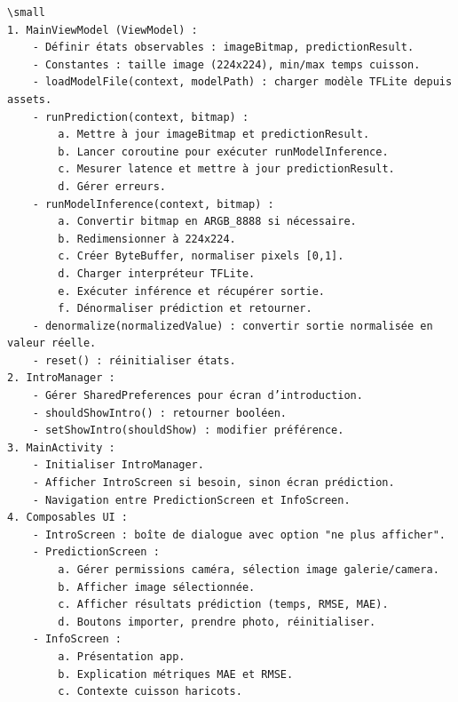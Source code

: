 \begin{verbatim}
\small
1. MainViewModel (ViewModel) :
    - Définir états observables : imageBitmap, predictionResult.
    - Constantes : taille image (224x224), min/max temps cuisson.
    - loadModelFile(context, modelPath) : charger modèle TFLite depuis assets.
    - runPrediction(context, bitmap) :
        a. Mettre à jour imageBitmap et predictionResult.
        b. Lancer coroutine pour exécuter runModelInference.
        c. Mesurer latence et mettre à jour predictionResult.
        d. Gérer erreurs.
    - runModelInference(context, bitmap) :
        a. Convertir bitmap en ARGB_8888 si nécessaire.
        b. Redimensionner à 224x224.
        c. Créer ByteBuffer, normaliser pixels [0,1].
        d. Charger interpréteur TFLite.
        e. Exécuter inférence et récupérer sortie.
        f. Dénormaliser prédiction et retourner.
    - denormalize(normalizedValue) : convertir sortie normalisée en valeur réelle.
    - reset() : réinitialiser états.
2. IntroManager :
    - Gérer SharedPreferences pour écran d’introduction.
    - shouldShowIntro() : retourner booléen.
    - setShowIntro(shouldShow) : modifier préférence.
3. MainActivity :
    - Initialiser IntroManager.
    - Afficher IntroScreen si besoin, sinon écran prédiction.
    - Navigation entre PredictionScreen et InfoScreen.
4. Composables UI :
    - IntroScreen : boîte de dialogue avec option "ne plus afficher".
    - PredictionScreen :
        a. Gérer permissions caméra, sélection image galerie/camera.
        b. Afficher image sélectionnée.
        c. Afficher résultats prédiction (temps, RMSE, MAE).
        d. Boutons importer, prendre photo, réinitialiser.
    - InfoScreen :
        a. Présentation app.
        b. Explication métriques MAE et RMSE.
        c. Contexte cuisson haricots.
\end{verbatim}

